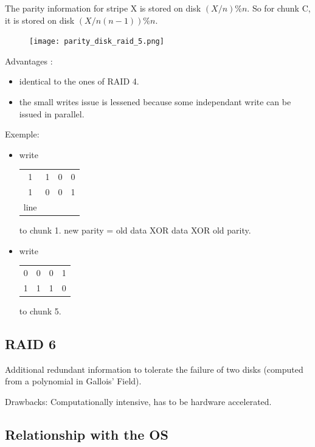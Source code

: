 The parity information for stripe X is stored on disk $(X/n)\%n$.
So for chunk C, it is stored on disk $(X/n(n-1))\%n$.

\begin{figure}[h!]
  \begin{center}
    \texttt{[image: parity\_disk\_raid\_5.png]}
    \caption{}
  \end{center}
\end{figure}


Advantages :

\begin{itemize}
  \item identical to the ones of RAID 4.
  \item the small writes issue is lessened because some independant write can be issued in parallel.
\end{itemize}

Exemple:

\begin{itemize}
  \item write
      \begin{tabular}{|cccc|}
      \hline
         1&1&0&0 \\
         1&0&0&1 \\
    line
      \end{tabular}
to chunk 1. new parity = old data XOR data XOR old parity.

\item write
      \begin{tabular}{|cccc|}
      \hline
         0&0&0&1 \\
         1&1&1&0 \\
      \hline
      \end{tabular}
to chunk 5. 
\end{itemize}

\subsection{RAID 6}

Additional redundant information to tolerate the failure of two disks (computed from a polynomial in Gallois' Field).

Drawbacks: Computationally intensive, has to be hardware accelerated.

\subsection{Relationship with the OS}

